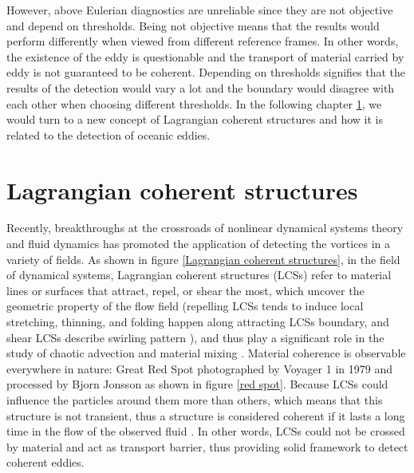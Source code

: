 However, above Eulerian diagnostics are unreliable since they are not objective and depend on thresholds. Being not objective means that the results would perform differently when viewed from different reference frames. In other words, the existence of the eddy is questionable and the transport of material carried by eddy is not guaranteed to be coherent. Depending on thresholds signifies that the results of the detection would vary a lot and the boundary would disagree with each other when choosing different thresholds. In the following chapter \ref{Coherent vortices and geodesic theory}, we would turn to a new concept of Lagrangian coherent structures and how it is related to the detection of oceanic eddies.

\clearpage 

\section{Lagrangian coherent structures}\label{Coherent vortices and geodesic theory}

Recently, breakthroughs at the crossroads of nonlinear dynamical systems theory and fluid dynamics has promoted the application of detecting the vortices in a variety of fields. As shown in figure \ref{Lagrangian coherent structures}, in the field of dynamical systems, Lagrangian coherent structures (LCSs) refer to material lines or surfaces that attract, repel, or shear the most, which uncover the geometric property of the flow field (repelling LCSs tends to induce local stretching, thinning, and folding happen along attracting LCSs boundary, and shear LCSs describe swirling pattern \cite{haller2000lagrangian}), and thus play a significant role in the study of chaotic advection and material mixing \cite{haller2015lagrangian,aref2017frontiers,bettencourt2012oceanic}. Material coherence is observable everywhere in nature: Great Red Spot  photographed by Voyager 1 in 1979 and processed by Bjorn Jonsson as shown in figure \ref{red spot}. Because LCSs could influence the particles around them more than others, which means that this structure is not transient, thus a structure is considered coherent if it lasts a long time in the flow of the observed fluid \cite{peacock2013lagrangian}. In other words, LCSs could not be crossed by material and act as transport barrier, thus providing solid framework to detect coherent eddies.      

